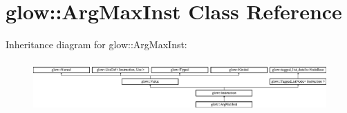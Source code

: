 \hypertarget{classglow_1_1_arg_max_inst}{}\section{glow\+:\+:Arg\+Max\+Inst Class Reference}
\label{classglow_1_1_arg_max_inst}
Inheritance diagram for glow\+:\+:Arg\+Max\+Inst\+:\begin{figure}[H]
\begin{center}
\leavevmode
\includegraphics[height=1.991111cm]{classglow_1_1_arg_max_inst}
\end{center}
\end{figure}
